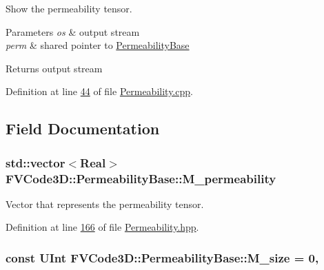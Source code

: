 Show the permeability tensor. 


\begin{DoxyParams}{Parameters}
{\em os} & output stream \\
\hline
{\em perm} & shared pointer to \hyperlink{classFVCode3D_1_1PermeabilityBase}{Permeability\+Base} \\
\hline
\end{DoxyParams}
\begin{DoxyReturn}{Returns}
output stream 
\end{DoxyReturn}


Definition at line \hyperlink{Permeability_8cpp_source_l00044}{44} of file \hyperlink{Permeability_8cpp_source}{Permeability.\+cpp}.



\subsection{Field Documentation}
\subsubsection[{\texorpdfstring{M\+\_\+permeability}{M_permeability}}]{\setlength{\rightskip}{0pt plus 5cm}std\+::vector$<${\bf Real}$>$ F\+V\+Code3\+D\+::\+Permeability\+Base\+::\+M\+\_\+permeability\hspace{0.3cm}{\ttfamily [protected]}}\hypertarget{classFVCode3D_1_1PermeabilityBase_aef595aa25abfeaf51e8d242e5de2055d}{}\label{classFVCode3D_1_1PermeabilityBase_aef595aa25abfeaf51e8d242e5de2055d}


Vector that represents the permeability tensor. 



Definition at line \hyperlink{Permeability_8hpp_source_l00166}{166} of file \hyperlink{Permeability_8hpp_source}{Permeability.\+hpp}.

\subsubsection[{\texorpdfstring{M\+\_\+size}{M_size}}]{\setlength{\rightskip}{0pt plus 5cm}const {\bf U\+Int} F\+V\+Code3\+D\+::\+Permeability\+Base\+::\+M\+\_\+size = 0\hspace{0.3cm}{\ttfamily [static]}, {\ttfamily [private]}}\hypertarget{classFVCode3D_1_1PermeabilityBase_a5914ac070cdad89b5b6f0133a0ee3ba5}{}\label{classFVCode3D_1_1PermeabilityBase_a5914ac070cdad89b5b6f0133a0ee3ba5}


